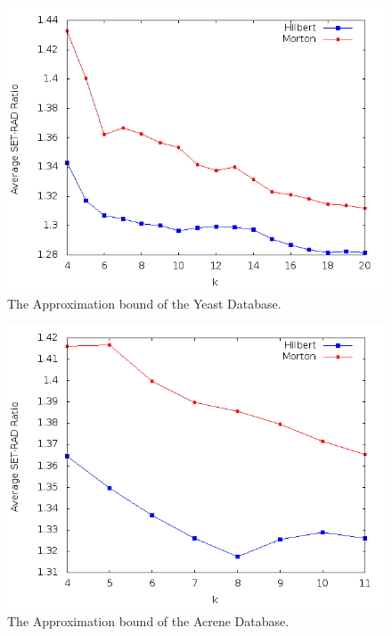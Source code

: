 \documentclass[10pt]{article}
\begin{document}
\begin{figure}
\begin{center}
\includegraphics[scale=0.5]{YeaGra2.png}
\caption{The Approximation bound of the Yeast Database.}
\label{approx-yeast}
\end{center}
\end{figure}

\begin{figure}
\begin{center}
\includegraphics[scale=0.5]{ArcGra2.png}
\caption{The Approximation bound of the Acrene Database.}
\label{approx-acrene}
\end{center}
\end{figure}
\end{document}
